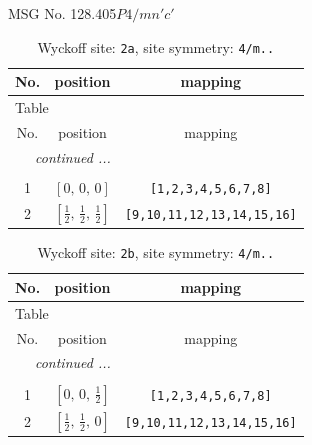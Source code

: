\documentclass[fleqn,8pt]{jsarticle}
\begin{document}
\setcounter{MaxMatrixCols}{32}

\renewcommand{\tablename}{Table~}
\renewcommand{\figurename}{Figure~}
\begin{center}
\LARGE
MSG No. 128.405\quad$P4/mn'c'$
\end{center}
\renewcommand{\arraystretch}{1.2}
\begin{longtable}{ccc}
\caption{Wyckoff site: {\tt 2a}, site symmetry: {\tt 4/m..}}
 \\
 \hline \hline
No. & position & mapping \\ \hline \endfirsthead

\multicolumn{2}{l}{\tablename\ \thetable{}} \\
 \hline \hline
No. & position & mapping \\ \hline \endhead

 \hline \hline
\multicolumn{2}{r}{\footnotesize\it continued ...} \\ \endfoot

 \hline \hline
\multicolumn{2}{r}{} \\ \endlastfoot

1 & $\left[ 0,\, 0,\, 0 \right]$ & {\tt [1,2,3,4,5,6,7,8]} \\ \hline
2 & $\left[ \frac{1}{2},\, \frac{1}{2},\, \frac{1}{2} \right]$ & {\tt [9,10,11,12,13,14,15,16]} \\
\end{longtable}
\renewcommand{\arraystretch}{1.2}
\begin{longtable}{ccc}
\caption{Wyckoff site: {\tt 2b}, site symmetry: {\tt 4/m..}}
 \\
 \hline \hline
No. & position & mapping \\ \hline \endfirsthead

\multicolumn{2}{l}{\tablename\ \thetable{}} \\
 \hline \hline
No. & position & mapping \\ \hline \endhead

 \hline \hline
\multicolumn{2}{r}{\footnotesize\it continued ...} \\ \endfoot

 \hline \hline
\multicolumn{2}{r}{} \\ \endlastfoot

1 & $\left[ 0,\, 0,\, \frac{1}{2} \right]$ & {\tt [1,2,3,4,5,6,7,8]} \\ \hline
2 & $\left[ \frac{1}{2},\, \frac{1}{2},\, 0 \right]$ & {\tt [9,10,11,12,13,14,15,16]} \\
\end{longtable}
\end{document}

